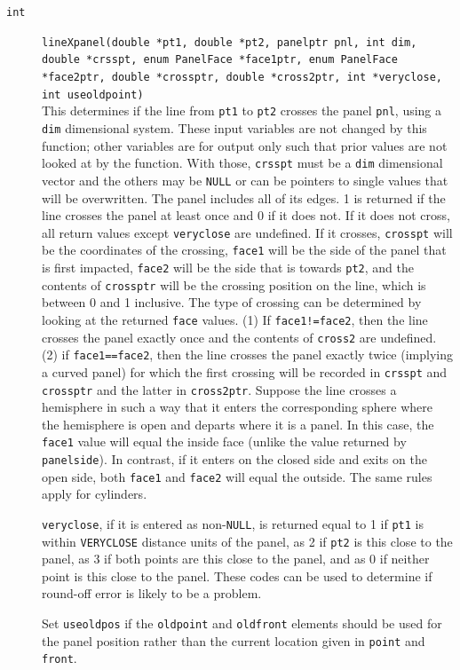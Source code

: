 \documentclass {scrbook}
\newcommand {\ttt} {\texttt}
\begin{document}
\begin{description}
\item[\ttt{int}]
\ttt{lineXpanel(double *pt1, double *pt2, panelptr pnl, int dim, double *crsspt, enum PanelFace *face1ptr, enum PanelFace *face2ptr, double *crossptr, double *cross2ptr, int *veryclose, int useoldpoint)}
\hfill \\
This determines if the line from \ttt{pt1} to \ttt{pt2} crosses the panel \ttt{pnl}, using a \ttt{dim} dimensional system. These input variables are not changed by this function; other variables are for output only such that prior values are not looked at by the function. With those, \ttt{crsspt} must be a \ttt{dim} dimensional vector and the others may be \ttt{NULL} or can be pointers to single values that will be overwritten. The panel includes all of its edges. 1 is returned if the line crosses the panel at least once and 0 if it does not. If it does not cross, all return values except \ttt{veryclose} are undefined. If it crosses, \ttt{crosspt} will be the coordinates of the crossing, \ttt{face1} will be the side of the panel that is first impacted, \ttt{face2} will be the side that is towards \ttt{pt2}, and the contents of \ttt{crossptr} will be the crossing position on the line, which is between 0 and 1 inclusive. The type of crossing can be determined by looking at the returned \ttt{face} values. (1) If \ttt{face1!=face2}, then the line crosses the panel exactly once and the contents of \ttt{cross2} are undefined. (2) if \ttt{face1==face2}, then the line crosses the panel exactly twice (implying a curved panel) for which the first crossing will be recorded in \ttt{crsspt} and \ttt{crossptr} and the latter in \ttt{cross2ptr}. Suppose the line crosses a hemisphere in such a way that it enters the corresponding sphere where the hemisphere is open and departs where it is a panel. In this case, the \ttt{face1} value will equal the inside face (unlike the value returned by \ttt{panelside}). In contrast, if it enters on the closed side and exits on the open side, both \ttt{face1} and \ttt{face2} will equal the outside. The same rules apply for cylinders.

\ttt{veryclose}, if it is entered as non-\ttt{NULL}, is returned equal to 1 if \ttt{pt1} is within \ttt{VERYCLOSE} distance units of the panel, as 2 if \ttt{pt2} is this close to the panel, as 3 if both points are this close to the panel, and as 0 if neither point is this close to the panel. These codes can be used to determine if round-off error is likely to be a problem.

Set \ttt{useoldpos} if the \ttt{oldpoint} and \ttt{oldfront} elements should be used for the panel position rather than the current location given in \ttt{point} and \ttt{front}.


\end{description}
\end{document}
